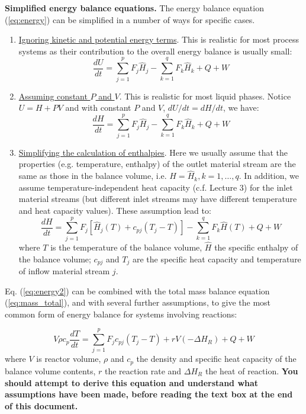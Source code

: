 \documentclass[a4paper,11pt]{article}
\theoremstyle{definition}
\begin{document}
\textbf{Simplified energy balance equations.} The energy balance equation (\ref{eq:energy}) can be simplified
in a number of ways for specific cases.
\begin{enumerate}
	\item \underline{Ignoring kinetic and potential energy terms}. This is realistic for most process systems as their contribution to the 
		overall energy balance is usually small: \\
		\[ \frac{d U}{d t} = \sum_{j=1}^p F_j \hat{H}_j - \sum_{k=1}^q F_k \hat{H}_k  + Q + W \]
	\item \underline{Assuming constant $P$ and $V$}. This is realistic for most liquid phases. Notice $U = H + PV$
		and with constant $P$ and $V$, $d U / d t = d H / d t$, we have: \\
		\[ \frac{d H}{d t} = \sum_{j=1}^p F_j \hat{H}_j - \sum_{k=1}^q F_k \hat{H}_k  + Q + W \]	
	\item \underline{Simplifying the calculation of enthalpies}. Here we usually assume that the properties (e.g. temperature, enthalpy) of the outlet material
		stream are the same as those in the balance volume, i.e. $H = \hat{H}_k, k=1,\ldots,q$.  
		In addition, we assume temperature-independent heat capacity (c.f. Lecture 3) for the inlet material streams (but different inlet streams may have different
		temperature and heat capacity values). These assumption lead to: \\
		\begin{equation} \label{eq:energy2} 
			\frac{d H}{d t} = \sum_{j=1}^p F_j \left[ \hat{H}_j(T) + c_{pj} (T_j - T) \right] - \sum_{k=1}^q F_k \hat{H}(T)  + Q + W
		\end{equation}
		\noindent where $T$ is the temperature of the balance volume, $\hat{H}$ the specific enthalpy of the balance volume;
			$c_{pj}$ and $T_j$ are the specific heat capacity and temperature of inflow material stream $j$.
\end{enumerate}

Eq. (\ref{eq:energy2}) can be combined with the total mass balance equation (\ref{eq:mass_total}), and with several further assumptions,
to give the most common form of energy balance for systems involving reactions:

\begin{equation} \label{eq:energy_react}
	V \rho c_p \frac{d T}{d t} = \sum_{j=1}^p F_j c_{pj} (T_j - T) + r V (-\Delta H_R) + Q + W
\end{equation}
\noindent where $V$ is reactor volume, $\rho$ and $c_p$ the density and specific heat capacity of the balance volume contents,
$r$ the reaction rate and $\Delta H_R$ the heat of reaction. 
\textbf{You should attempt to derive this equation and understand what assumptions have been made, before reading the text box 
at the end of this document.}
\end{document}
